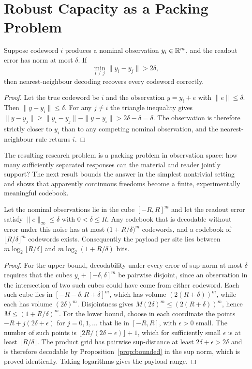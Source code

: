 \section{Robust Capacity as a Packing Problem}\label{sec:packing}

\begin{proposition}\label{prop:bounded}
Suppose codeword $i$ produces a nominal observation $y_i\in\mathbb{R}^m$, and the readout error has norm at most $\delta$. If
\[
\min_{i\ne j}\|y_i-y_j\|>2\delta ,
\]
then nearest-neighbour decoding recovers every codeword correctly.
\end{proposition}

\begin{proof}
Let the true codeword be $i$ and the observation $y=y_i+e$ with $\|e\|\le\delta$. Then $\|y-y_i\|\le\delta$. For any $j\ne i$ the triangle inequality gives $\|y-y_j\|\ge\|y_i-y_j\|-\|y-y_i\|>2\delta-\delta=\delta$. The observation is therefore strictly closer to $y_i$ than to any competing nominal observation, and the nearest-neighbour rule returns $i$.
\end{proof}

The resulting research problem is a packing problem in observation space: how many sufficiently separated responses can the material and reader jointly support? The next result bounds the answer in the simplest nontrivial setting and shows that apparently continuous freedoms become a finite, experimentally meaningful codebook.

\begin{proposition}\label{prop:packing}
Let the nominal observations lie in the cube $[-R,R]^m$ and let the readout error satisfy $\|e\|_\infty\le\delta$ with $0<\delta\le R$. Any codebook that is decodable without error under this noise has at most $\bigl(1+R/\delta\bigr)^m$ codewords, and a codebook of $\lfloor R/\delta\rfloor^{m}$ codewords exists. Consequently the payload per site lies between $m\log_2\lfloor R/\delta\rfloor$ and $m\log_2(1+R/\delta)$ bits.
\end{proposition}

\begin{proof}
For the upper bound, decodability under every error of sup-norm at most $\delta$ requires that the cubes $y_i+[-\delta,\delta]^m$ be pairwise disjoint, since an observation in the intersection of two such cubes could have come from either codeword. Each such cube lies in $[-R-\delta,R+\delta]^m$, which has volume $(2(R+\delta))^m$, while each has volume $(2\delta)^m$. Disjointness gives $M(2\delta)^m\le(2(R+\delta))^m$, hence $M\le(1+R/\delta)^m$. For the lower bound, choose in each coordinate the points $-R+j(2\delta+\epsilon)$ for $j=0,1,\dots$ that lie in $[-R,R]$, with $\epsilon>0$ small. The number of such points is $\lfloor 2R/(2\delta+\epsilon)\rfloor+1$, which for sufficiently small $\epsilon$ is at least $\lfloor R/\delta\rfloor$. The product grid has pairwise sup-distance at least $2\delta+\epsilon>2\delta$ and is therefore decodable by Proposition~\ref{prop:bounded} in the sup norm, which is proved identically. Taking logarithms gives the payload range.
\end{proof}

